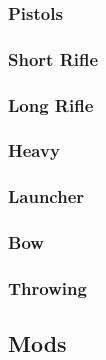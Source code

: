 \documentclass[12pt,a4paper,openany]{book}
\begin{document}
	\subsubsection{Pistols}
	\subsubsection{Short Rifle}
	\subsubsection{Long Rifle}
	\subsubsection{Heavy}
	\subsubsection{Launcher}
	\subsubsection{Bow}
	\subsubsection{Throwing}
	\subsection{Mods}
\end{document}
